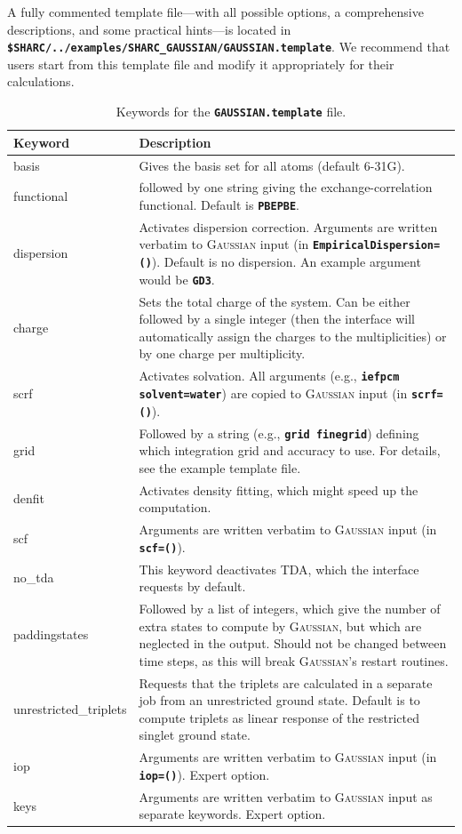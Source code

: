 \documentclass[a4paper,10pt,DIV=15,openany]{scrbook}
\newcommand{\ttt}[1]{\textbf{\texttt{#1}}}
\begin{document}
A fully commented template file---with all possible options, a comprehensive descriptions, and some practical hints---is located in \ttt{\$SHARC/../examples/SHARC\_GAUSSIAN/GAUSSIAN.template}.
We recommend that users start from this template file and modify it appropriately for their calculations.

\begin{table}
  \centering
  \caption{Keywords for the \ttt{GAUSSIAN.template} file.}
  \label{tab:gauss_temp}
  \small
  \begin{tabular}{>{\ttfamily}lp{12cm}}
  \hline
  Keyword       &Description\\
  \hline
basis                   &Gives the basis set for all atoms (default 6-31G).
\\
functional              &followed by one string giving the exchange-correlation functional. Default is \ttt{PBEPBE}.
\\
dispersion              &Activates dispersion correction. Arguments are written verbatim to \textsc{Gaussian} input (in \ttt{EmpiricalDispersion=()}). Default is no dispersion. An example argument would be \ttt{GD3}.
\\
charge                  &Sets the total charge of the system. Can be either followed by a single integer (then the interface will automatically assign the charges to the multiplicities) or by one charge per multiplicity. 
\\
scrf                    &Activates solvation. All arguments (e.g., \ttt{iefpcm solvent=water}) are copied to \textsc{Gaussian} input (in \ttt{scrf=()}).
\\
grid                    &Followed by a string (e.g., \ttt{grid finegrid}) defining which integration grid and accuracy to use. For details, see the example template file.
\\
denfit                  &Activates density fitting, which might speed up the computation.
\\
scf                     &Arguments are written verbatim to \textsc{Gaussian} input (in \ttt{scf=()}).
\\
no\_tda                 &This keyword deactivates TDA, which the interface requests by default.
\\
paddingstates           &Followed by a list of integers, which give the number of extra states to compute by \textsc{Gaussian}, but which are neglected in the output. Should not be changed between time steps, as this will break \textsc{Gaussian}'s restart routines.
\\
unrestricted\_triplets  &Requests that the triplets are calculated in a separate job from an unrestricted ground state. Default is to compute triplets as linear response of the restricted singlet ground state.
\\
iop                     &Arguments are written verbatim to \textsc{Gaussian} input (in \ttt{iop=()}). Expert option.
\\
keys                    &Arguments are written verbatim to \textsc{Gaussian} input as separate keywords. Expert option.
\\
  \hline
  \end{tabular}
\end{table}
\end{document}
